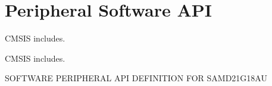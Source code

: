 \hypertarget{group___s_a_m_d21_g18_a_u__api}{}\section{Peripheral Software A\+PI}
\label{group___s_a_m_d21_g18_a_u__api}


C\+M\+S\+IS includes.  


C\+M\+S\+IS includes. 

S\+O\+F\+T\+W\+A\+RE P\+E\+R\+I\+P\+H\+E\+R\+AL A\+PI D\+E\+F\+I\+N\+I\+T\+I\+ON F\+OR S\+A\+M\+D21\+G18\+AU 